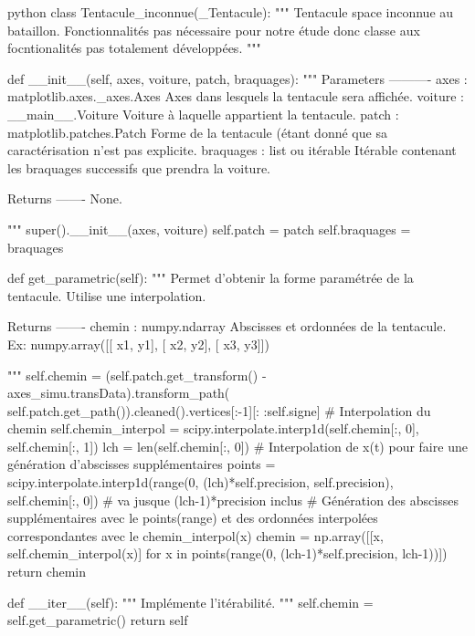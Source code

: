 \begin{mintedbox}{python}
class Tentacule_inconnue(_Tentacule):
    """
    Tentacule space inconnue au bataillon. Fonctionnalités pas nécessaire pour notre étude donc classe aux focntionalités pas totalement développées.
    """

    def __init__(self, axes, voiture, patch, braquages):
        """
        Parameters
        ----------
        axes : matplotlib.axes._axes.Axes
            Axes dans lesquels la tentacule sera affichée.
        voiture : __main__.Voiture
            Voiture à laquelle appartient la tentacule.
        patch : matplotlib.patches.Patch
            Forme de la tentacule (étant donné que sa caractérisation n'est pas explicite.
        braquages : list ou itérable
            Itérable contenant les braquages successifs que prendra la voiture.

        Returns
        -------
        None.

        """
        super().__init__(axes, voiture)
        self.patch = patch
        self.braquages = braquages

    def get_parametric(self):
        """
        Permet d'obtenir la forme paramétrée de la tentacule. Utilise une interpolation.

        Returns
        -------
        chemin : numpy.ndarray
            Abscisses et ordonnées de la tentacule.
            Ex: numpy.array([[ x1,   y1],
                             [ x2,   y2],
                             [ x3,   y3]])

        """
        self.chemin = (self.patch.get_transform() - axes_simu.transData).transform_path( self.patch.get_path()).cleaned().vertices[:-1][: :self.signe]
        # Interpolation du chemin
        self.chemin_interpol = scipy.interpolate.interp1d(self.chemin[:, 0], self.chemin[:, 1])
        lch = len(self.chemin[:, 0])
        # Interpolation de x(t) pour faire une génération d'abscisses supplémentaires
        points = scipy.interpolate.interp1d(range(0, (lch)*self.precision, self.precision), self.chemin[:, 0])  # va jusque (lch-1)*precision inclus
        # Génération des abscisses supplémentaires avec le points(range) et des ordonnées interpolées correspondantes avec le chemin_interpol(x)
        chemin = np.array([[x, self.chemin_interpol(x)] for x in points(range(0, (lch-1)*self.precision, lch-1))])
        return chemin

    def __iter__(self):
        """
        Implémente l'itérabilité.
        """
        self.chemin = self.get_parametric()
        return self


\end{mintedbox}
